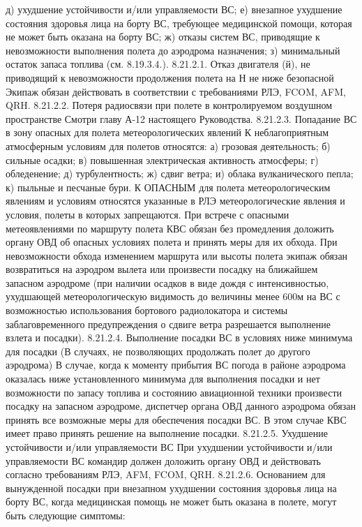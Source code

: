 д)	ухудшение устойчивости и/или управляемости ВС;
е)	внезапное ухудшение состояния здоровья лица на борту ВС, требующее медицинской помощи, которая не может быть оказана на борту ВС;
ж)	отказы систем ВС, приводящие к невозможности выполнения полета до аэродрома назначения;
з)	минимальный остаток запаса топлива (см. 8.19.3.4.).
8.21.2.1.	Отказ двигателя (й), не приводящий к невозможности продолжения полета на Н не ниже безопасной
Экипаж обязан действовать в соответствии с требованиями РЛЭ, FCOM, AFM, QRH.
8.21.2.2.	Потеря радиосвязи при полете в контролируемом воздушном пространстве
Смотри главу А-12 настоящего Руководства.
8.21.2.3.	Попадание ВС в зону опасных для полета метеорологических явлений
К неблагоприятным атмосферным условиям для полетов относятся:
а)	грозовая деятельность;
б)	сильные осадки;
в)	повышенная электрическая активность атмосферы;
г)	обледенение;
д)	турбулентность;
ж)  сдвиг ветра;
и)  облака вулканического пепла;
к)  пыльные и песчаные бури.
К ОПАСНЫМ для полета метеорологическим явлениям и условиям относятся указанные в РЛЭ метеорологические явления и условия, полеты в которых запрещаются.
При встрече с опасными метеоявлениями по маршруту полета КВС обязан без промедления доложить органу ОВД об опасных условиях полета и принять меры для их обхода. При невозможности обхода изменением маршрута или высоты полета экипаж обязан возвратиться на аэродром вылета или произвести посадку на ближайшем запасном аэродроме (при наличии осадков в виде дождя с интенсивностью, ухудшающей метеорологическую видимость до величины менее 600м на ВС с возможностью использования бортового радиолокатора и системы заблаговременного предупреждения о сдвиге ветра разрешается выполнение взлета и посадки).
8.21.2.4.	Выполнение посадки ВС в условиях ниже минимума для посадки
(В случаях, не позволяющих продолжать полет до другого аэродрома)
В случае, когда к моменту прибытия ВС погода в районе аэродрома оказалась ниже установленного минимума для выполнения посадки и нет возможности по запасу топлива и состоянию авиационной техники произвести посадку на запасном аэродроме, диспетчер органа ОВД данного аэродрома обязан принять все возможные меры для обеспечения посадки ВС. В этом случае КВС имеет право принять решение на выполнение посадки.
8.21.2.5.	Ухудшение устойчивости и/или управляемости ВС
При ухудшении устойчивости и/или управляемости ВС командир должен доложить органу ОВД и действовать согласно требованиям РЛЭ, AFM, FCOM, QRH.
8.21.2.6.	Основанием для вынужденной посадки при внезапном ухудшении состояния здоровья лица на борту ВС, когда медицинская помощь не может быть оказана в полете, могут быть следующие симптомы:
